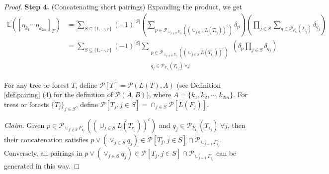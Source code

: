 \begin{proof}
 
 \textbf{Step 4.} (Concatenating short pairings) Expanding the product, we get
 \begin{equation}\label{eq.lemrenorm4}
  \begin{split}
  \mathbb{E}([\eta_{k_1}\cdots \eta_{k_{2m}}]_F) &= \sum_{S\subseteq\{1,\cdots,r\}}(-1)^{|S|}
  \left(\sum_{p\in \mathcal{P}_{\cup_{j'\notin S} F_{\mathfrak{r}_{j'}}}((\cup_{j\in S}L(T_{\mathfrak{r}_j}))^c)}\delta_p\right)
  \left(\prod_{j\in S}\sum_{q\in \mathcal{P}_{F_{\mathfrak{r}_j}}(T_{\mathfrak{r}_j})} \delta_{q_j}\right)
  \\
  & =\sum_{S\subseteq\{1,\cdots,r\}}(-1)^{|S|}\sum_{\substack{p\in \mathcal{P}_{\cup_{j'\notin S} F_{\mathfrak{r}_{j'}}}((\cup_{j\in S}L(T_{\mathfrak{r}_j}))^c)
  \\q_j\in 
  \mathcal{P}_{F_{\mathfrak{r}_j}}(T_{\mathfrak{r}_j})\ \forall j}} \left(\delta_p
  \prod_{j\in S} \delta_{q_j}\right)
  \end{split}
 \end{equation}
 
  
  
 For any tree or forest $T$, define $\mathcal{P}[T]=\mathcal{P}(L(T),A)$ (see Definition \ref{def.pairing} (4) for the definition of $\mathcal{P}(A,B)$), where $A=\{k_1,k_2,\cdots,k_{2m}\}$. For trees or forests $\{T_j\}_{j\in S}$, define $\mathcal{P}[T_j,j\in S]=\cap_{j\in S}\mathcal{P}[L(F_j)]$. 
 
 \textit{Claim.} Given $p\in \mathcal{P}_{\cup_{j'\notin S} F_{\mathfrak{r}_{j'}}}((\cup_{j\in S}L(T_{\mathfrak{r}_j}))^c)$ and $q_j\in 
 \mathcal{P}_{F_{\mathfrak{r}_j}}(T_{\mathfrak{r}_j})\ \forall j$, then their concatenation satisfies $p\vee (\vee_{j\in S} q_j)\in \mathcal{P}[T_j,j\in S]\cap \mathcal{P}_{\cup_{j=1}^r F_{\mathfrak{r}_{j}}}$. Conversely, all pairings in $p\vee (\vee_{j\in S} q_j)\in \mathcal{P}[T_j,j\in S]\cap \mathcal{P}_{\cup_{j=1}^r F_{\mathfrak{r}_{j}}}$ can be generated in this way.
 

\end{proof}
